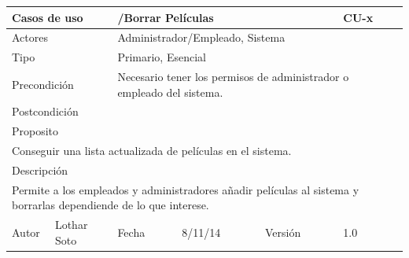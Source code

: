 \documentclass{article}
\begin{document}
\begin{table}[h]
\begin{tabular}{|l|l|l|l|l|l|}
\hline
\multicolumn{2}{|p{2cm}|}{Casos de uso}  & \multicolumn{3}{p{7cm}|}{/Borrar Películas} & CU-x \\
\hline
\multicolumn{2}{|p{2cm}|}{Actores}       & \multicolumn{4}{p{8cm}|}{Administrador/Empleado, Sistema}        \\
\hline
\multicolumn{2}{|p{2cm}|}{Tipo}          & \multicolumn{4}{p{8cm}|}{Primario, Esencial}        \\
\hline
\multicolumn{2}{|p{2cm}|}{Precondición}  & \multicolumn{4}{p{8cm}|}{Necesario tener los permisos de administrador o empleado del sistema.}        \\
\hline
\multicolumn{2}{|p{2cm}|}{Postcondición} & \multicolumn{4}{p{8cm}|}{}        \\
\hline
\multicolumn{6}{|p{10cm}|}{Proposito}                                   \\
\hline
\multicolumn{6}{|p{10cm}|}{Conseguir una lista actualizada de películas en el sistema.}                                            \\
\hline
\multicolumn{6}{|p{10cm}|}{Descripción}                                 \\
\hline
\multicolumn{6}{|p{10cm}|}{Permite a los empleados y administradores añadir películas al sistema y borrarlas dependiende de lo que interese.}                                            \\
\hline
Autor          &       Lothar Soto        & Fecha    &  8/11/14   &   Versión  & 1.0\\    
\hline
\end{tabular}
\end{table}

\clearpage
\end{document}
